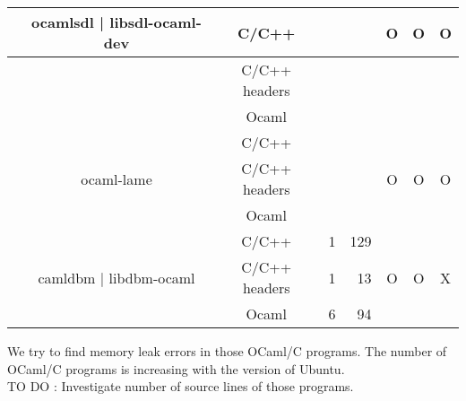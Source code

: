 \documentclass[11pt,a4paper]{article}
\begin{document}
\begin{table}[h,t]
\begin{tabular}{|>{\centering}m{3cm}| c|c|r|r| c| c|c|}
 &\multirow{3}{3cm}{ocamlsdl | libsdl-ocaml-dev} & C/C++ &  &  & \multirow{3}{*}{O} & \multirow{3}{*}{O} & \multirow{3}{*}{O}\\
 \cline{3-5}
 & &                           C/C++ headers &  &  & & & \\
 \cline{3-5}
 & &                          Ocaml &  &  & & & \\
 \cline{2-8}



 &\multirow{3}{*}{ocaml-lame} & C/C++ &  &  & \multirow{3}{*}{O} & \multirow{3}{*}{O} & \multirow{3}{*}{O}\\
 \cline{3-5}
 & &                           C/C++ headers &  &  & & & \\
 \cline{3-5}
 & &                          Ocaml &  &  & & & \\
 \cline{2-8}

 &\multirow{3}{3cm}{camldbm | libdbm-ocaml} & C/C++ & 1 & 129 & \multirow{3}{*}{O} & \multirow{3}{*}{O} & \multirow{3}{*}{X}\\
\cline{3-5}
& &                           C/C++ headers & 1 & 13 & & & \\
\cline{3-5}
& &                          Ocaml & 6 & 94 & & & \\
\hline

\end{tabular}
\end{table}













We try to find memory leak errors in those OCaml/C programs. The number of OCaml/C programs is increasing with the version of Ubuntu.
\\
TO DO : Investigate number of source lines of those programs.
\\
%
%
\end{document}
